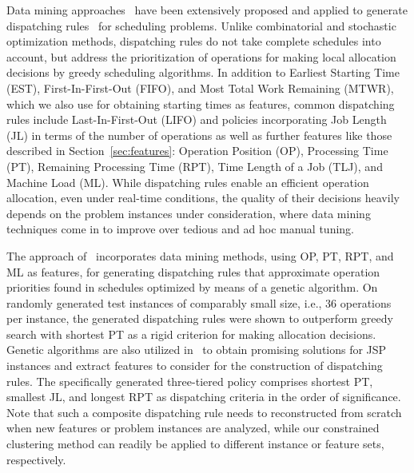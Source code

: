 \documentclass[runningheads]{llncs}
\begin{document}
Data mining approaches~\cite{ismail2012production} have been extensively proposed and applied to generate %
dispatching rules~\cite{blackstone1982state} for scheduling problems.
Unlike combinatorial and stochastic optimization methods, dispatching rules do not take
complete schedules into account, but address the prioritization of operations for making
local allocation decisions by greedy scheduling algorithms.
In addition to Earliest Starting Time (EST), First-In-First-Out (FIFO), and
Most Total Work Remaining (MTWR), which we also use for obtaining starting times as features,
common dispatching rules include Last-In-First-Out (LIFO) and policies incorporating
Job Length (JL) in terms of the number of operations as well as further features
like those described in Section~\ref{sec:features}:
Operation Position (OP), Processing Time (PT), Remaining Processing Time (RPT), 
Time Length of a Job (TLJ), and Machine Load (ML).
While dispatching rules enable an efficient operation allocation,
even under real-time conditions, the quality of their decisions heavily depends on the
problem instances under consideration, where data mining techniques come in to
improve over tedious and ad hoc manual tuning.

The approach of~\cite{koonce2000using} incorporates data mining methods,
using OP, PT, RPT, and ML as features, for generating dispatching rules that approximate
operation priorities found in schedules optimized by means of a genetic algorithm.
On randomly generated test instances of comparably small size, i.e., $36$ operations
per instance, the generated dispatching rules were shown to outperform greedy search
with shortest PT as a rigid criterion for making allocation decisions.
Genetic algorithms are also utilized in~\cite{harrath2002genetic} to obtain
promising solutions for JSP instances and extract features to consider for the
construction of dispatching rules.
The specifically generated three-tiered policy comprises shortest PT, smallest JL, and longest RPT as
dispatching criteria in the order of significance.
Note that such a composite dispatching rule needs to reconstructed from scratch when
new features or problem instances are analyzed, while our constrained clustering method
can readily be applied to different instance or feature sets, respectively.
\end{document}
